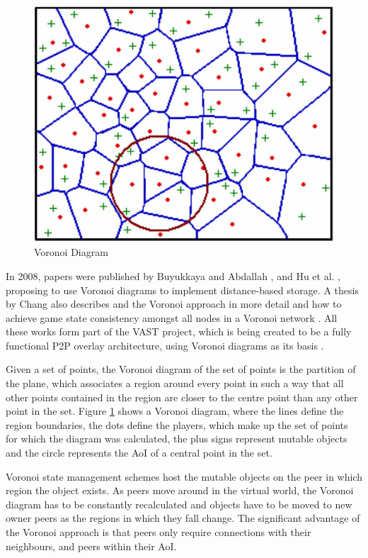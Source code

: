 \documentclass[10pt,a4paper,journal,cspaper,compsoc]{IEEEtran}
\begin{document}
\begin{figure}[htbp]
 \centering
 \includegraphics[width=\columnwidth]{voronoi_diagram}
 \caption{Voronoi Diagram \cite{Buyukkaya_voronoi_state_management}}
 \label{fig_voronoi_diagram}
\end{figure}
%
In 2008, papers were published by Buyukkaya and Abdallah \cite{Buyukkaya_voronoi_state_management}, and Hu et al. \cite{Hu_voronoi_IM}, proposing to
use Voronoi diagrams \cite{voronoi_diagrams_survey} to implement distance-based storage. A thesis by Chang also describes and the Voronoi approach in
more detail and how to achieve game state consistency amongst all nodes in a Voronoi network \cite{Chang_Voronoi_state_management_masters}. All these
works form part of the VAST project, which is being created to be a fully functional P2P overlay architecture, using Voronoi diagrams as its basis
\cite{VAST}.

Given a set of points, the Voronoi diagram of the set of points is the partition of the plane, which associates a region around every point in such a
way that all other points contained in the region are closer to the centre point than any other point in the set. Figure \ref{fig_voronoi_diagram}
shows a Voronoi diagram, where the lines define the region boundaries, the dots define the players, which make up the set of points for which the
diagram was calculated, the plus signs represent mutable objects and the circle represents the \ac{AoI} of a central point in the set.

Voronoi state management schemes host the mutable objects on the peer in which region the object exists. As peers move around in the virtual world,
the Voronoi diagram has to be constantly recalculated and objects have to be moved to new owner peers as the regions in which they fall change. The
significant advantage of the Voronoi approach is that peers only require connections with their neighbours, and peers within their AoI.
\end{document}
